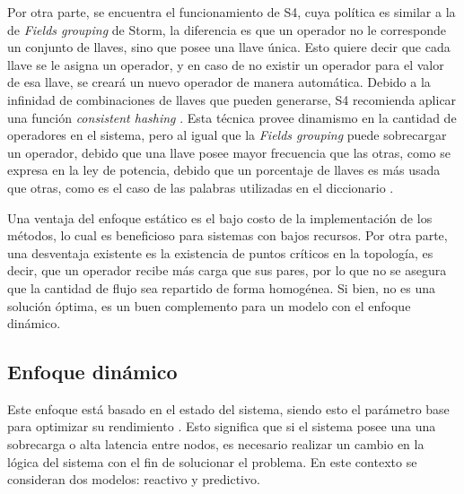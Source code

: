 Por otra parte, se encuentra el funcionamiento de S4, cuya política es similar a la de \textit{Fields grouping} de Storm, la diferencia es que un operador no le corresponde un conjunto de llaves, sino que posee una llave única. Esto quiere decir que cada llave se le asigna un operador, y en caso de no existir un operador para el valor de esa llave, se creará un nuevo operador de manera automática. Debido a la infinidad de combinaciones de llaves que pueden generarse, S4 recomienda aplicar una función \textit{consistent hashing} \citep{X11cp}. Esta técnica provee dinamismo en la cantidad de operadores en el sistema, pero al igual que la \textit{Fields grouping} puede sobrecargar un operador, debido que una llave posee mayor frecuencia que las otras, como se expresa en la ley de potencia, debido que un porcentaje de llaves es más usada que otras, como es el caso de las palabras utilizadas en el diccionario \citep{rushton2010handbook}.

Una ventaja del enfoque estático es el bajo costo de la implementación de los métodos, lo cual es beneficioso para sistemas con bajos recursos. Por otra parte, una desventaja existente es la existencia de puntos críticos en la topología, es decir, que un operador recibe más carga que sus pares, por lo que no se asegura que la cantidad de flujo sea repartido de forma homogénea. Si bien, no es una solución óptima, es un buen complemento para un modelo con el enfoque dinámico.

\subsection{Enfoque dinámico}
\label{subsec:enfoqueDinamicoBC}


Este enfoque está basado en el estado del sistema, siendo esto el parámetro base para optimizar su rendimiento \citep{CasavantK88}. Esto significa que si el sistema posee una una sobrecarga o alta latencia entre nodos, es necesario realizar un cambio en la lógica del sistema con el fin de solucionar el problema. En este contexto se consideran dos modelos: reactivo y predictivo.

